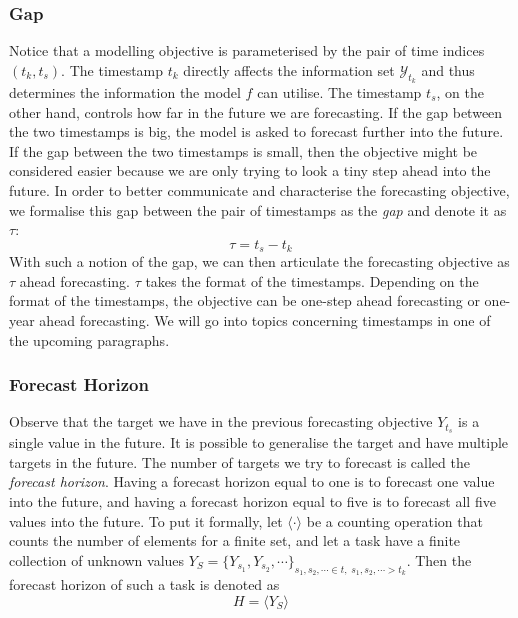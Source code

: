 \subsubsection{Gap}
Notice that a modelling objective is parameterised by the pair of time indices $(t_k, t_s)$. The timestamp $t_k$ directly affects the information set $\mathcal{Y}_{t_k}$ and thus determines the information the model $f$ can utilise. The timestamp $t_s$, on the other hand, controls how far in the future we are forecasting. If the gap between the two timestamps is big, the model is asked to forecast further into the future. If the gap between the two timestamps is small, then the objective might be considered easier because we are only trying to look a tiny step ahead into the future. In order to better communicate and characterise the forecasting objective, we formalise this gap between the pair of timestamps as the \textit{gap} and denote it as $\tau$:
\begin{equation*}
    \tau = t_s - t_k
\end{equation*}
With such a notion of the gap, we can then articulate the forecasting objective as $\tau$ ahead forecasting. $\tau$ takes the format of the timestamps. Depending on the format of the timestamps, the objective can be one-step ahead forecasting or one-year ahead forecasting. We will go into topics concerning timestamps in one of the upcoming paragraphs.

\subsubsection{Forecast Horizon}
Observe that the target we have in the previous forecasting objective $Y_{t_s}$ is a single value in the future. It is possible to generalise the target and have multiple targets in the future. The number of targets we try to forecast is called the \textit{forecast horizon}. Having a forecast horizon equal to one is to forecast one value into the future, and having a forecast horizon equal to five is to forecast all five values into the future. To put it formally, let $\langle \cdot \rangle$ be a counting operation that counts the number of elements for a finite set, and let a task have a finite collection of unknown values $Y_S = \{ Y_{s_1}, Y_{s_2}, \cdots \}_{s_1, s_2, \cdots \in t, \; s_1, s_2, \cdots > t_k}$. Then the forecast horizon of such a task is denoted as
\begin{equation*}
    H = \langle Y_S \rangle
\end{equation*}

